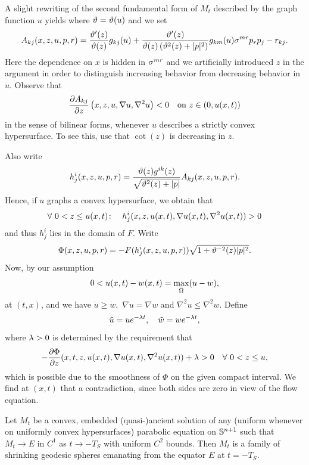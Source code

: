 \documentclass{amsart}
\begin{document}
{A slight rewriting of the second fundamental form of $M_t$ described by the graph function $u$ yields
 where $\vt=\vt(u)$ and we set
 $$A_{kj}(x,z,u,p,r)=\fr{\vt'(z)}{\vt(z)}g_{kj}(u)+\fr{\vt'(z)}{\vt(z)\br{\vt^2(z)+|p|^2}}g_{km}(u)\s^{mr}p_rp_j-r_{kj}.$$
 Here the dependence on $x$ is hidden in $\s^{mr}$ and we artificially introduced $z$ in the argument in order to distinguish increasing behavior from decreasing behavior in $u.$ Observe that
 $$\fr{\del A_{kj}}{\del z}\br{x,z,u,\nabla u,\nabla^2u}<0\quad\text{on}~ z\in(0,u(x,t))$$
 in the sense of bilinear forms, whenever $u$ describes a strictly convex hypersurface. To see this, use that $\cot(z)$ is decreasing in $z.$

Also write
$$h^i_j(x,z,u,p,r)=\fr{\vt(z)g^{ik}(z)}{\sqrt{\vt^2(z)+|p|}}A_{kj}(x,z,u,p,r).$$
Hence, if $u$ graphs a convex hypersurface, we obtain that
$$\forall~ 0<z\leq u(x,t)\cn\quad h^i_j(x,z,u(x,t),\nabla u(x,t),\nabla^2u(x,t))>0$$
 and thus $h^i_j$ lies in the domain of $F.$ Write
  $$\Phi(x,z,u,p,r)=-F(h^i_j(x,z,u,p,r))\sqrt{1+\vt^{-2}(z)|p|^2}.$$
Now, by our assumption
 $$0<u(x,t)-w(x,t)=\max_{\-\O}(u-w),$$
 at $(t,x)$, and we have $\dot{u}\geq \dot{w},$ $\nabla u=\nabla w$ and $\nabla^2u\leq \nabla^2w.$ Define
 $$\~u=ue^{-\l t},\quad \~w=we^{-\l t},$$
 where $\l>0$ is determined by the requirement that
$$-\fr{\del\Phi}{\del z}(x,t,z,u(x,t),\nabla u(x,t),\nabla^2 u(x,t))+\l>0\quad\forall~ 0<z\leq u,
$$
 which is possible due to the smoothness of $\Phi$ on the given compact interval. We find at $(x,t)$ that
 a contradiction, since both sides are zero in view of the flow equation.
}
\begin{thm}
\label{thm:classification}
Let \(M_t\) be a convex, embedded (quasi-)ancient solution of any (uniform whenever on uniformly convex hypersurfaces) parabolic equation on \(\S^{n+1}\) such that \(M_t \to E\) in \(C^1\) as \(t \to -T_S\) with uniform \(C^2\) bounds. Then \(M_t\) is a family of shrinking geodesic spheres emanating from the equator \(E\) at \(t=-T_S\).
\end{thm}
\end{document}
